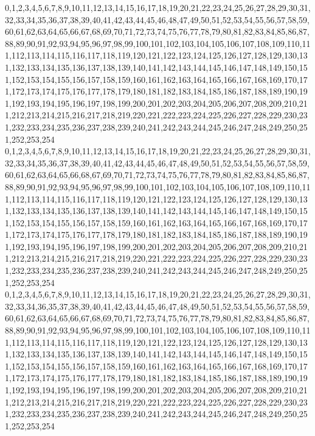 \documentclass[12pt]{article}
\begin{document}
{0,1,2,3,4,5,6,7,8,9,10,11,12,13,14,15,16,17,18,19,20,21,22,23,24,25,26,27,28,29,30,31,32,33,34,35,36,37,38,39,40,41,42,43,44,45,46,48,47,49,50,51,52,53,54,55,56,57,58,59,60,61,62,63,64,65,66,67,68,69,70,71,72,73,74,75,76,77,78,79,80,81,82,83,84,85,86,87,88,89,90,91,92,93,94,95,96,97,98,99,100,101,102,103,104,105,106,107,108,109,110,111,112,113,114,115,116,117,118,119,120,121,122,123,124,125,126,127,128,129,130,131,132,133,134,135,136,137,138,139,140,141,142,143,144,145,146,147,148,149,150,151,152,153,154,155,156,157,158,159,160,161,162,163,164,165,166,167,168,169,170,171,172,173,174,175,176,177,178,179,180,181,182,183,184,185,186,187,188,189,190,191,192,193,194,195,196,197,198,199,200,201,202,203,204,205,206,207,208,209,210,211,212,213,214,215,216,217,218,219,220,221,222,223,224,225,226,227,228,229,230,231,232,233,234,235,236,237,238,239,240,241,242,243,244,245,246,247,248,249,250,251,252,253,254\\
0,1,2,3,4,5,6,7,8,9,10,11,12,13,14,15,16,17,18,19,20,21,22,23,24,25,26,27,28,29,30,31,32,33,34,35,36,37,38,39,40,41,42,43,44,45,46,47,48,49,50,51,52,53,54,55,56,57,58,59,60,61,62,63,64,65,66,68,67,69,70,71,72,73,74,75,76,77,78,79,80,81,82,83,84,85,86,87,88,89,90,91,92,93,94,95,96,97,98,99,100,101,102,103,104,105,106,107,108,109,110,111,112,113,114,115,116,117,118,119,120,121,122,123,124,125,126,127,128,129,130,131,132,133,134,135,136,137,138,139,140,141,142,143,144,145,146,147,148,149,150,151,152,153,154,155,156,157,158,159,160,161,162,163,164,165,166,167,168,169,170,171,172,173,174,175,176,177,178,179,180,181,182,183,184,185,186,187,188,189,190,191,192,193,194,195,196,197,198,199,200,201,202,203,204,205,206,207,208,209,210,211,212,213,214,215,216,217,218,219,220,221,222,223,224,225,226,227,228,229,230,231,232,233,234,235,236,237,238,239,240,241,242,243,244,245,246,247,248,249,250,251,252,253,254\\
0,1,2,3,4,5,6,7,8,9,10,11,12,13,14,15,16,17,18,19,20,21,22,23,24,25,26,27,28,29,30,31,32,33,34,36,35,37,38,39,40,41,42,43,44,45,46,47,48,49,50,51,52,53,54,55,56,57,58,59,60,61,62,63,64,65,66,67,68,69,70,71,72,73,74,75,76,77,78,79,80,81,82,83,84,85,86,87,88,89,90,91,92,93,94,95,96,97,98,99,100,101,102,103,104,105,106,107,108,109,110,111,112,113,114,115,116,117,118,119,120,121,122,123,124,125,126,127,128,129,130,131,132,133,134,135,136,137,138,139,140,141,142,143,144,145,146,147,148,149,150,151,152,153,154,155,156,157,158,159,160,161,162,163,164,165,166,167,168,169,170,171,172,173,174,175,176,177,178,179,180,181,182,183,184,185,186,187,188,189,190,191,192,193,194,195,196,197,198,199,200,201,202,203,204,205,206,207,208,209,210,211,212,213,214,215,216,217,218,219,220,221,222,223,224,225,226,227,228,229,230,231,232,233,234,235,236,237,238,239,240,241,242,243,244,245,246,247,248,249,250,251,252,253,254\\
}
\end{document}
